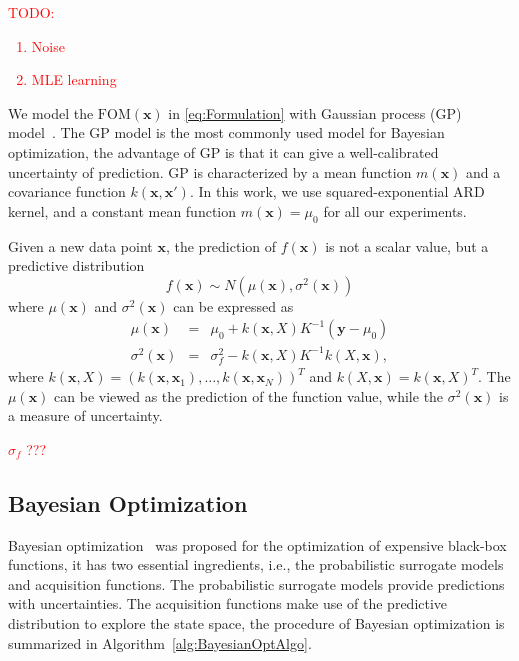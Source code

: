 \textcolor{red}{
    TODO:
    \begin{enumerate}
            \item Noise
            \item MLE learning
    \end{enumerate}
}

We model the $\mathrm{FOM}(\bm{x})$ in \eqref{eq:Formulation} with Gaussian
process (GP) model~\cite{GPML}. The GP model is the most commonly used model
for Bayesian optimization, the advantage of GP is that it can give a
well-calibrated uncertainty of prediction. GP is characterized by a mean
function $m(\bm{x})$ and a covariance function $k(\bm{x}, \bm{x'})$. In this
work, we use squared-exponential ARD kernel, and a constant mean function
$m(\bm{x}) = \mu_0$ for all our experiments.

Given a new data point $\bm{x}$, the prediction of $f(\bm{x})$ is
not a scalar value, but a predictive distribution 
\begin{equation}
f(\bm{x}) \sim N(\mu(\bm{x}),
\sigma^2(\bm{x}))
\label{eq:GPRPred}
\end{equation}
where $\mu(\bm{x})$ and $\sigma^2(\bm{x})$ can be expressed as
\begin{equation}
        \begin{array}{lll}
            \mu(\bm{x}) &=& \mu_0 + k(\bm{x},X)K^{-1}(\bm{y} - \mu_0) \\
            \sigma^2(\bm{x}) &=& \sigma_f^2 - k(\bm{x}, X)K^{-1}k(X, \bm{x}), 
        \end{array}
    \label{eq:GPRPredEqNoisy}
\end{equation}
where $k(\bm{x}, X) = (k(\bm{x}, \bm{x}_1), \dots, k(\bm{x},
\bm{x}_N))^T$ and $k(X, \bm{x}) = k(\bm{x}, X)^T$. The
$\mu(\bm{x})$ can be viewed as the prediction of the function value, while
the $\sigma^2(\bm{x})$ is a measure of uncertainty. 

\textcolor{red}{$\sigma_f$ ???}

\subsection{Bayesian Optimization}

Bayesian optimization~\cite{shahriari2016taking} was proposed for the
optimization of expensive black-box functions, it has two essential
ingredients, i.e., the probabilistic surrogate models and acquisition
functions. The probabilistic surrogate models provide predictions with
uncertainties. The acquisition functions make use of the predictive
distribution to explore the state space, the procedure of Bayesian optimization
is summarized in Algorithm~\ref{alg:BayesianOptAlgo}.


